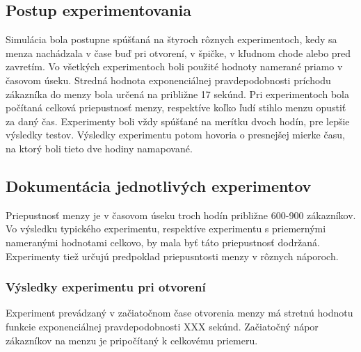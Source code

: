 \documentclass{article}
\begin{document}
\subsection{Postup experimentovania}
Simulácia bola postupne spúšťaná na štyroch rôznych experimentoch, kedy sa menza nachádzala v čase buď pri otvorení, v špičke, v kľudnom chode alebo pred zavretím. Vo všetkých experimentoch boli použité hodnoty namerané priamo v časovom úseku. Stredná hodnota exponenciálnej pravdepodobnosti príchodu zákazníka do menzy bola určená na približne 17 sekúnd. Pri experimentoch bola počítaná celková priepustnosť menzy, respektíve koľko ľudí stihlo menzu opustiť za daný čas. Experimenty boli vždy spúšťané na merítku dvoch hodín, pre lepšie výsledky testov. Výsledky experimentu potom hovoria o presnejšej mierke času, na ktorý boli tieto dve hodiny namapované.

\subsection{Dokumentácia jednotlivých experimentov}
Priepustnosť menzy je v časovom úseku troch hodín približne 600-900 zákazníkov. Vo výsledku typického experimentu, respektíve experimentu s priemernými nameranými hodnotami celkovo, by mala byť táto priepustnosť dodržaná. Experimenty tiež určujú predpoklad priepusntosti menzy v rôznych náporoch.

\subsubsection{Výsledky experimentu pri otvorení}
Experiment prevádzaný v začiatočnom čase otvorenia menzy má stretnú hodnotu funkcie exponenciálnej pravdepodobnosti XXX sekúnd. Začiatočný nápor zákazníkov na menzu je pripočítaný k celkovému priemeru.
\end{document}
